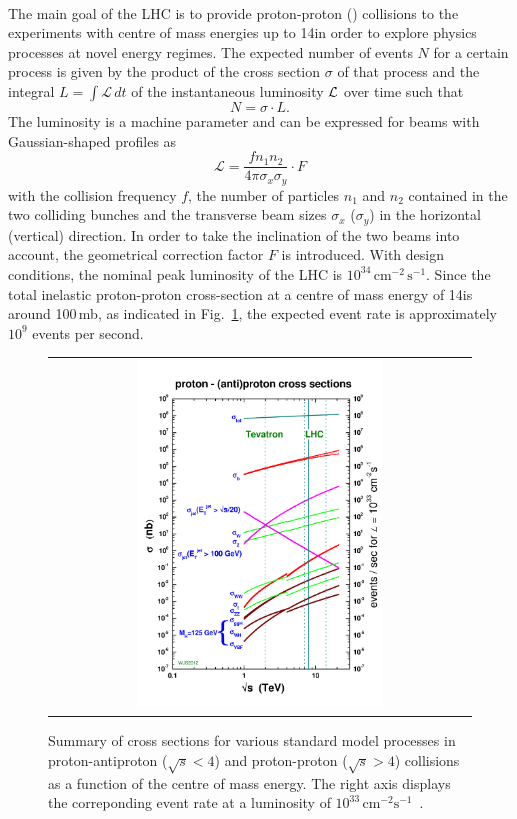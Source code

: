 \\
The main goal of the LHC is to provide proton-proton (\pp) collisions to the experiments with centre of mass energies up to 14\tev in order to explore physics processes at novel energy regimes. The expected number of events $N$ for a certain process is given by the product of the cross section $\sigma$ of that process and the integral $L = \int \mathcal{L}  \, dt$ of the instantaneous luminosity $\cal L$ over time such that
\begin{equation}
  N = \sigma \cdot L . 
  \label{eq:lumi}
\end{equation}
The luminosity is a machine parameter and can be expressed for beams with Gaussian-shaped profiles as  
\begin{equation}
  \mathcal{L} = \frac{f n_{1} n_{2}}{4 \pi \sigma_{x} \sigma_{y}} \cdot F
  \label{eq:lumi}
\end{equation}
with the collision frequency $f$, the number of particles $n_1$ and $n_2$ contained in the two colliding bunches and the transverse beam sizes $\sigma_{x}$ ($\sigma_{y}$) in the horizontal (vertical) direction. In order to take the inclination of the two beams into account, the geometrical correction factor $F$ is introduced. With design conditions, the nominal peak luminosity of the LHC is $10^{34} \, \mathrm{cm}^{-2} \, \mathrm{s}^{-1}$. Since the total inelastic proton-proton cross-section at a centre of mass energy of 14\tev is around 100\,mb, as indicated in Fig.~\ref{fig:CrossSections}, the expected event rate is approximately $10^9$ events per second. \\
\begin{figure}[!tp]
  \centering
  \begin{tabular}{c}
    \includegraphics[width=0.60\textwidth]{figures/crosssections2012_v5-1.pdf}
  \end{tabular}
  \caption{Summary of cross sections for various standard model processes in proton-antiproton ($\sqrt{s} < 4$\tev) and proton-proton ($\sqrt{s} > 4$\tev) collisions as a function of the centre of mass energy. The right axis displays the correponding event rate at a luminosity of $\mathrm{10^{33}\,cm^{-2} s^{-1}}$~\cite{bib:stirling:pcom}.}
  \label{fig:CrossSections}
\end{figure}
